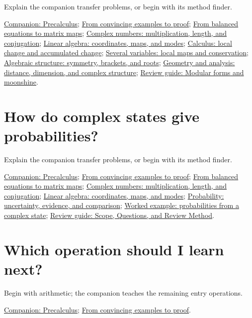 Explain the companion transfer problems, or begin with its method finder.

\href{https://github.com/Oichkatzelesfrettschen/precalc_paper}{Companion: Precalculus}; \hyperref[learn:proof]{From convincing examples to proof}; \hyperref[learn:matrix_maps]{From balanced equations to matrix maps}; \hyperref[learn:complex_numbers]{Complex numbers: multiplication, length, and conjugation}; \hyperref[learn:linear_algebra]{Linear algebra: coordinates, maps, and modes}; \hyperref[learn:calculus]{Calculus: local change and accumulated change}; \hyperref[learn:multivariable]{Several variables: local maps and conservation}; \hyperref[learn:algebra]{Algebraic structure: symmetry, brackets, and roots}; \hyperref[learn:geometry]{Geometry and analysis: distance, dimension, and complex structure}; \href{https://github.com/Oichkatzelesfrettschen/MathScienceCompendium/blob/main/docs/learning/lessons/review_geometry.md}{Review guide: Modular forms and moonshine}.

\section*{How do complex states give probabilities?}

Explain the companion transfer problems, or begin with its method finder.

\href{https://github.com/Oichkatzelesfrettschen/precalc_paper}{Companion: Precalculus}; \hyperref[learn:proof]{From convincing examples to proof}; \hyperref[learn:matrix_maps]{From balanced equations to matrix maps}; \hyperref[learn:complex_numbers]{Complex numbers: multiplication, length, and conjugation}; \hyperref[learn:linear_algebra]{Linear algebra: coordinates, maps, and modes}; \hyperref[learn:probability]{Probability: uncertainty, evidence, and comparison}; \hyperref[learn:quantum]{Worked example: probabilities from a complex state}; \href{https://github.com/Oichkatzelesfrettschen/MathScienceCompendium/blob/main/docs/learning/lessons/review_evidence.md}{Review guide: Scope, Questions, and Review Method}.

\section*{Which operation should I learn next?}

Begin with arithmetic; the companion teaches the remaining entry operations.

\href{https://github.com/Oichkatzelesfrettschen/precalc_paper}{Companion: Precalculus}; \hyperref[learn:proof]{From convincing examples to proof}.

